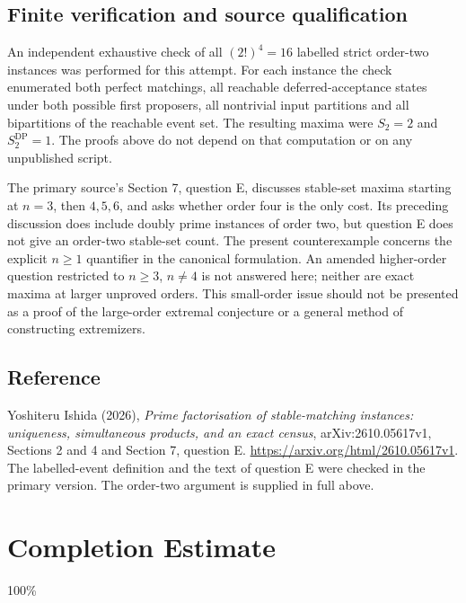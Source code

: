\documentclass[11pt,a4paper]{article}
\begin{document}
\subsection*{Finite verification and source qualification}
An independent exhaustive check of all $(2!)^4=16$ labelled strict order-two instances was performed for this attempt. For each instance the check enumerated both perfect matchings, all reachable deferred-acceptance states under both possible first proposers, all nontrivial input partitions and all bipartitions of the reachable event set. The resulting maxima were $S_2=2$ and $S_2^{\mathrm{DP}}=1$. The proofs above do not depend on that computation or on any unpublished script.

The primary source's Section 7, question E, discusses stable-set maxima starting at $n=3$, then $4,5,6$, and asks whether order four is the only cost. Its preceding discussion does include doubly prime instances of order two, but question E does not give an order-two stable-set count. The present counterexample concerns the explicit $n\geq1$ quantifier in the canonical formulation. An amended higher-order question restricted to $n\geq3$, $n\ne4$ is not answered here; neither are exact maxima at larger unproved orders. This small-order issue should not be presented as a proof of the large-order extremal conjecture or a general method of constructing extremizers.

\subsection*{Reference}
Yoshiteru Ishida (2026), \emph{Prime factorisation of stable-matching instances: uniqueness, simultaneous products, and an exact census}, arXiv:2610.05617v1, Sections 2 and 4 and Section 7, question E. \url{https://arxiv.org/html/2610.05617v1}. The labelled-event definition and the text of question E were checked in the primary version. The order-two argument is supplied in full above.

\section{Completion Estimate}
100\%
\end{document}

